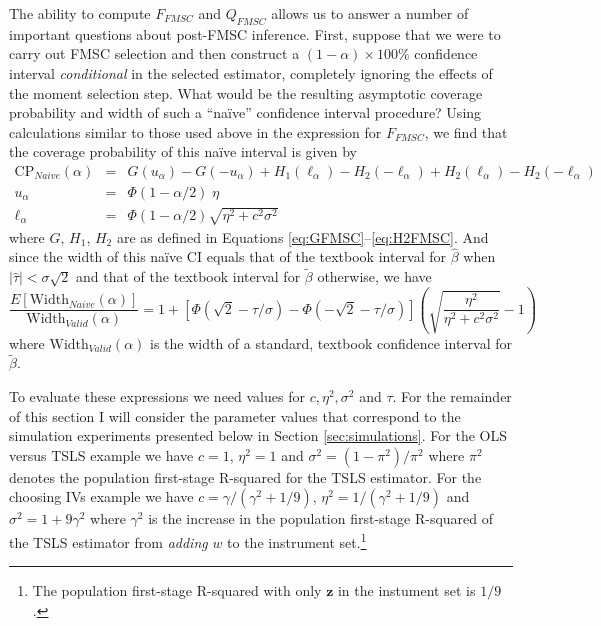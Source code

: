 The ability to compute $F_{FMSC}$ and $Q_{FMSC}$ allows us to answer a number of important questions about post-FMSC inference.
First, suppose that we were to carry out FMSC selection and then construct a $(1 - \alpha) \times 100\%$ confidence interval \emph{conditional} in the selected estimator, completely ignoring the effects of the moment selection step.
What would be the resulting asymptotic coverage probability and width of such a ``na\"{i}ve'' confidence interval procedure?
Using calculations similar to those used above in the expression for $F_{FMSC}$, we find that the coverage probability of this na\"{i}ve interval is given by
\begin{eqnarray*}
  \mbox{CP}_{Naive}(\alpha) &=& G(u_\alpha) - G(-u_\alpha) +  H_1(\ell_\alpha) - H_2(-\ell_\alpha) +  H_2(\ell_\alpha) - H_2(-\ell_\alpha) \\
  u_\alpha &=& \Phi(1 - \alpha/2)\; \eta\\
  \ell_{\alpha} &=& \Phi(1 - \alpha/2) \sqrt{\eta^2 + c^2\sigma^2}
\end{eqnarray*}
where $G$, $H_1$, $H_2$ are as defined in Equations \ref{eq:GFMSC}--\ref{eq:H2FMSC}.
And since the width of this na\"{i}ve CI equals that of the textbook interval for $\widehat{\beta}$ when $|\widehat{\tau}|<\sigma\sqrt{2}$ and that of the textbook interval for $\widetilde{\beta}$ otherwise, we have
\begin{equation*}
  \frac{E\left[ \mbox{Width}_{Naive}(\alpha) \right]}{\mbox{Width}_{Valid}(\alpha)} = 1 + \left[ \Phi( \sqrt{2} - \tau/\sigma) -  \Phi( -\sqrt{2} - \tau/\sigma )\right]\left( \sqrt{\frac{\eta^2}{\eta^2 + c^2 \sigma^2}} - 1 \right)
\end{equation*}
where $\mbox{Width}_{Valid}(\alpha)$ is the width of a standard, textbook confidence interval for $\widetilde{\beta}$.

To evaluate these expressions we need values for $c, \eta^2, \sigma^2$ and $\tau$.
For the remainder of this section I will consider the parameter values that correspond to the simulation experiments presented below in Section \ref{sec:simulations}.
For the OLS versus TSLS example we have $c=1$, $\eta^2=1$ and $\sigma^2 = (1-\pi^2)/\pi^2$ where $\pi^2$ denotes the population first-stage R-squared for the TSLS estimator. 
For the choosing IVs example we have $c =\gamma/(\gamma^2 +1/9)$, $\eta^2 = 1/(\gamma^2 + 1/9)$ and $\sigma^2 = 1 + 9\gamma^2$ where $\gamma^2$ is the increase in the population first-stage R-squared of the TSLS estimator from \emph{adding} $w$ to the instrument set.\footnote{The population first-stage R-squared with only $\mathbf{z}$ in the instument set is $1/9$.}

